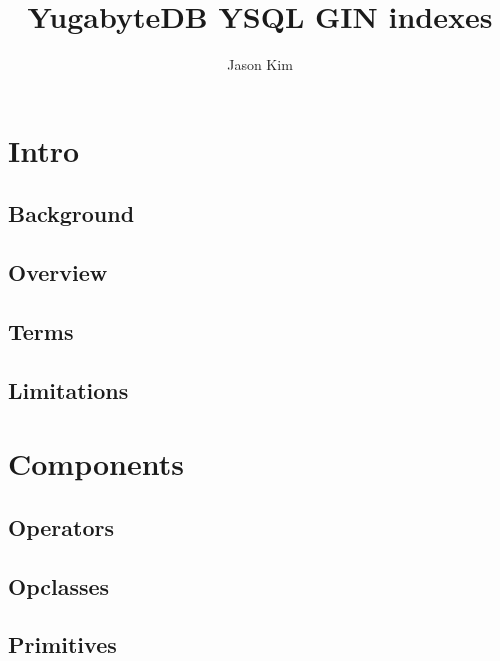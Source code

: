 \documentclass[11pt]{article}
\title{YugabyteDB YSQL GIN indexes}
\author{
    Jason Kim
}
\begin{document}
\maketitle
\tableofcontents

\newpage
\hypertarget{intro}{%
\section{Intro}\label{intro}}

\hypertarget{background}{%
\subsection{Background}\label{background}}


\hypertarget{overview}{%
\subsection{Overview}\label{overview}}


\hypertarget{terms}{%
\subsection{Terms}\label{terms}}


\hypertarget{limitations}{%
\subsection{Limitations}\label{limitations}}


\newpage
\hypertarget{components}{%
\section{Components}\label{components}}


\hypertarget{operators}{%
\subsection{Operators}\label{operators}}


\hypertarget{opclasses}{%
\subsection{Opclasses}\label{opclasses}}


\hypertarget{primitives}{%
\subsection{Primitives}\label{primitives}}

\end{document}

